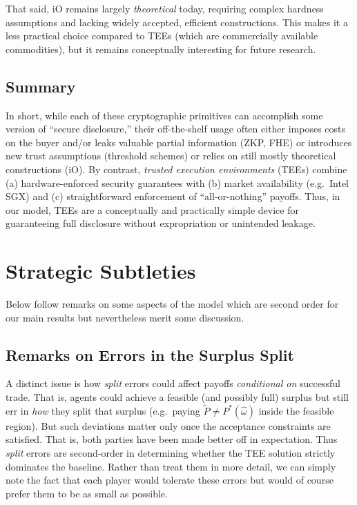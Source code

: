 \documentclass{article}
\begin{document}
That said, iO remains largely \emph{theoretical} today, requiring complex hardness assumptions and lacking widely accepted, efficient constructions. This makes it a less practical choice compared to TEEs (which are commercially available commodities), but it remains conceptually interesting for future research.

\subsection*{Summary}
In short, while each of these cryptographic primitives can accomplish some version of “secure disclosure,” their off-the-shelf usage often either imposes costs on the buyer and/or leaks valuable partial information (ZKP, FHE) or introduces new trust assumptions (threshold schemes) 
or relies on still mostly theoretical constructions (iO). 
By contrast, \emph{trusted execution environments} (TEEs) combine 
(a) hardware-enforced security guarantees with 
(b) market availability (e.g.\ Intel SGX) and 
(c) straightforward enforcement of “all-or-nothing” payoffs. 
Thus, in our model, TEEs are a conceptually and practically simple device 
for guaranteeing full disclosure without expropriation or unintended leakage.

\section{Strategic Subtleties}\label{app:theta}
Below follow remarks on some aspects of the model which are second order for our main results but nevertheless merit some discussion.

\subsection{Remarks on Errors in the Surplus Split}\label{app:surplus}

A distinct issue is how \emph{split} errors could affect payoffs \emph{conditional on} successful trade. That is, agents could achieve a feasible (and possibly full) surplus but still err in \emph{how} they split that surplus (e.g.\ paying $\widetilde{P}\neq P^*(\hat{\omega})$ inside the feasible region). But such deviations matter only once the acceptance constraints are satisfied. That is, both parties have been made better off in expectation. Thus \emph{split} errors are second‐order in determining whether the TEE solution strictly dominates the baseline. Rather than treat them in more detail, we can simply note the fact that each player would tolerate these errors but would of course prefer them to be as small as possible.
\end{document}
